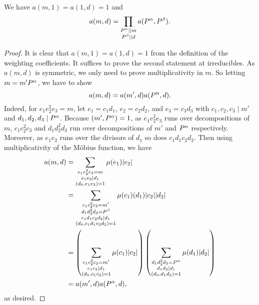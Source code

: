 \documentclass[12pt,reqno,oneside]{amsart}
\begin{document}
    \begin{proposition}\label{prop:multiplicativity_of_weighting_coefficients}
        We have $a(m,1) = a(1,d) = 1$ and
        \[
            a(m,d) = \prod_{\substack{P^{\alpha} \mid\mid m \\ P^{\beta} \mid\mid d}}a(P^{\alpha},P^{\beta}).
        \]
    \end{proposition}
    \begin{proof}
        It is clear that $a(m,1) = a(1,d) = 1$ from the definition of the weighting coefficients. It suffices to prove the second statement at irreducibles. As $a(m,d)$ is symmetric, we only need to prove multiplicativity in $m$. So letting $m = m'P^{\alpha}$, we have to show
        \[
            a(m,d) = a(m',d)a(P^{\alpha},d).
        \]
        Indeed, for $e_{1}e_{2}^{2}e_{3} = m$, let $e_{1} = c_{1}d_{1}$, $e_{2} = c_{2}d_{2}$, and $e_{3} = c_{3}d_{3}$ with $c_{1},c_{2},c_{3} \mid m'$ and $d_{1},d_{2},d_{3} \mid P^{\alpha}$. Because $(m',P^{\alpha}) = 1$, as $e_{1}e_{2}^{2}e_{3}$ runs over decompositions of $m$, $c_{1}c_{2}^{2}c_{3}$ and $d_{1}d_{2}^{2}d_{3}$ run over decompositions of $m'$ and $P^{\alpha}$ respectively. Moreover, as $e_{1}e_{2}$ runs over the divisors of $d_{1}$ so does $c_{1}d_{1}c_{2}d_{2}$. Then using multiplicativity of the M\"obius function, we have
        \begin{align*}
            a(m,d) &= \sum_{\substack{e_{1}e_{2}^{2}e_{3} = m \\ e_{1}e_{2} \mid d_{1} \\ (d_{0},e_{1}e_{3}) = 1}}\mu(e_{1})|e_{2}| \\
            &= \sum_{\substack{c_{1}c_{2}^{2}c_{3} = m' \\ d_{1}d_{2}^{2}d_{3} = P^{\beta} \\ c_{1}d_{1}c_{2}d_{2} \mid d_{1} \\ (d_{0},c_{1}d_{1}c_{3}d_{3}) = 1}}\mu(c_{1})(d_{1})|c_{2}||d_{2}| \\
            &= \left(\sum_{\substack{c_{1}c_{2}^{2}c_{3} = m' \\ c_{1}c_{2} \mid d_{1} \\ (d_{0},c_{1}c_{3}) = 1}}\mu(c_{1})|c_{2}|\right)\left(\sum_{\substack{d_{1}d_{2}^{2}d_{3} = P^{\alpha} \\ d_{1}d_{2} \mid d_{1} \\ (d_{0},d_{1}d_{3}) = 1}}\mu(d_{1})|d_{2}|\right) \\
            &= a(m',d)a(P^{\alpha},d),
        \end{align*}
        as desired.
    \end{proof}
\end{document}
